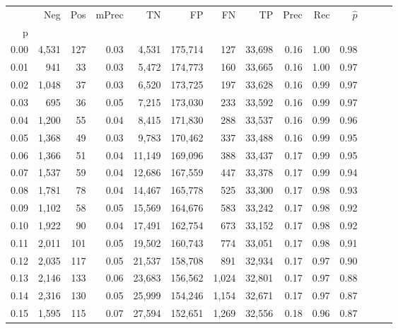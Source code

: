 \begin{tabular}{rrrrrrrrrrrrrr}
\toprule
{} &    Neg &    Pos & mPrec &       TN &       FP &      FN &      TP &  Prec &   Rec & $\hat{p}$ \\
p    &        &        &       &          &          &         &         &       &       &           \\
\midrule
0.00 &  4,531 &    127 &  0.03 &    4,531 &  175,714 &     127 &  33,698 &  0.16 &  1.00 &      0.98 \\
0.01 &    941 &     33 &  0.03 &    5,472 &  174,773 &     160 &  33,665 &  0.16 &  1.00 &      0.97 \\
0.02 &  1,048 &     37 &  0.03 &    6,520 &  173,725 &     197 &  33,628 &  0.16 &  0.99 &      0.97 \\
0.03 &    695 &     36 &  0.05 &    7,215 &  173,030 &     233 &  33,592 &  0.16 &  0.99 &      0.97 \\
0.04 &  1,200 &     55 &  0.04 &    8,415 &  171,830 &     288 &  33,537 &  0.16 &  0.99 &      0.96 \\
0.05 &  1,368 &     49 &  0.03 &    9,783 &  170,462 &     337 &  33,488 &  0.16 &  0.99 &      0.95 \\
0.06 &  1,366 &     51 &  0.04 &   11,149 &  169,096 &     388 &  33,437 &  0.17 &  0.99 &      0.95 \\
0.07 &  1,537 &     59 &  0.04 &   12,686 &  167,559 &     447 &  33,378 &  0.17 &  0.99 &      0.94 \\
0.08 &  1,781 &     78 &  0.04 &   14,467 &  165,778 &     525 &  33,300 &  0.17 &  0.98 &      0.93 \\
0.09 &  1,102 &     58 &  0.05 &   15,569 &  164,676 &     583 &  33,242 &  0.17 &  0.98 &      0.92 \\
0.10 &  1,922 &     90 &  0.04 &   17,491 &  162,754 &     673 &  33,152 &  0.17 &  0.98 &      0.92 \\
0.11 &  2,011 &    101 &  0.05 &   19,502 &  160,743 &     774 &  33,051 &  0.17 &  0.98 &      0.91 \\
0.12 &  2,035 &    117 &  0.05 &   21,537 &  158,708 &     891 &  32,934 &  0.17 &  0.97 &      0.90 \\
0.13 &  2,146 &    133 &  0.06 &   23,683 &  156,562 &   1,024 &  32,801 &  0.17 &  0.97 &      0.88 \\
0.14 &  2,316 &    130 &  0.05 &   25,999 &  154,246 &   1,154 &  32,671 &  0.17 &  0.97 &      0.87 \\
0.15 &  1,595 &    115 &  0.07 &   27,594 &  152,651 &   1,269 &  32,556 &  0.18 &  0.96 &      0.87 \\

\end{tabular}
